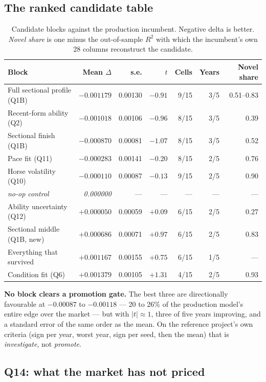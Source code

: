 \documentclass[11pt,a4paper]{article}
\begin{document}
\subsection{The ranked candidate table}

\begin{table}[htbp]\centering\small
\caption{Candidate blocks against the production incumbent. Negative delta is
better. \emph{Novel share} is one minus the out-of-sample $R^2$ with which the
incumbent's own 28 columns reconstruct the candidate.}
\begin{tabular}{lrrrrrr}
\toprule
Block & Mean $\Delta$ & s.e. & $t$ & Cells & Years & Novel share\\
\midrule
Full sectional profile (Q1B) & $-0.001179$ & 0.00130 & $-0.91$ & 9/15 & 3/5 & 0.51--0.83\\
Recent-form ability (Q2) & $-0.001018$ & 0.00106 & $-0.96$ & 8/15 & 3/5 & 0.39\\
Sectional finish (Q1B) & $-0.000870$ & 0.00081 & $-1.07$ & 8/15 & 3/5 & 0.52\\
Pace fit (Q11) & $-0.000283$ & 0.00141 & $-0.20$ & 8/15 & 2/5 & 0.76\\
Horse volatility (Q10) & $-0.000110$ & 0.00087 & $-0.13$ & 9/15 & 2/5 & 0.90\\
\rowcolor{shade} \emph{no-op control} & \emph{0.000000} & --- & --- & --- & --- & ---\\
Ability uncertainty (Q12) & $+0.000050$ & 0.00059 & $+0.09$ & 6/15 & 2/5 & 0.27\\
Sectional middle (Q1B, new) & $+0.000686$ & 0.00071 & $+0.97$ & 6/15 & 2/5 & 0.83\\
Everything that survived & $+0.001167$ & 0.00155 & $+0.75$ & 6/15 & 1/5 & ---\\
Condition fit (Q6) & $+0.001379$ & 0.00105 & $+1.31$ & 4/15 & 2/5 & 0.93\\
\bottomrule
\end{tabular}
\end{table}

\textbf{No block clears a promotion gate.} The best three are directionally
favourable at $-0.00087$ to $-0.00118$ --- 20 to 26\% of the production model's
entire edge over the market --- but with $|t|\approx 1$, three of five years
improving, and a standard error of the same order as the mean. On the reference
project's own criteria (sign per year, worst year, sign per seed, then the mean)
that is \emph{investigate}, not \emph{promote}.

\subsection{Q14: what the market has not priced}
\end{document}
